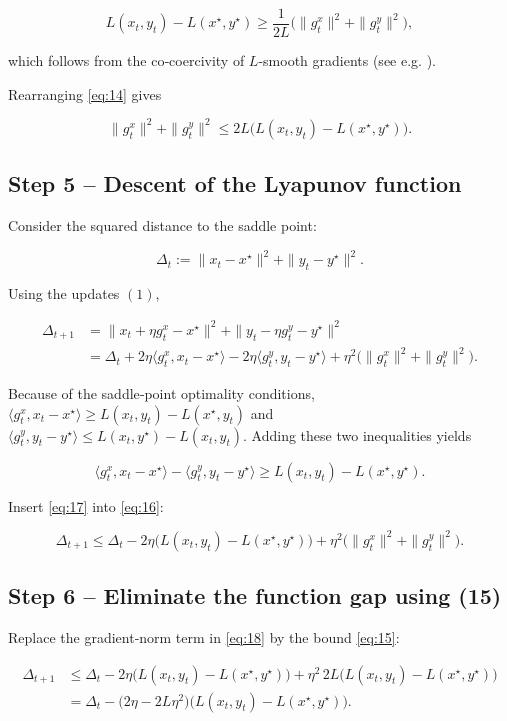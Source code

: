 \documentclass{article}
\begin{document}
\[
L(x_t,y_t)-L(x^{\star},y^{\star})
\ge \frac{1}{2L}\big(\|g_t^{x}\|^{2}+\|g_t^{y}\|^{2}\big),
\tag{14}
\]

which follows from the co‑coercivity of \(L\)-smooth gradients (see e.g. \cite{nesterov2004introductory}).  

Rearranging \eqref{eq:14} gives  

\[
\|g_t^{x}\|^{2}+\|g_t^{y}\|^{2}
\le 2L\big(L(x_t,y_t)-L(x^{\star},y^{\star})\big).
\tag{15}
\]

\subsection*{Step 5 – Descent of the Lyapunov function}
Consider the squared distance to the saddle point:

\[
\Delta_{t}:=\|x_t-x^{\star}\|^{2}+\|y_t-y^{\star}\|^{2}.
\]

Using the updates \((1)\),

\[
\begin{aligned}
\Delta_{t+1}
&= \|x_t+\eta g_t^{x}-x^{\star}\|^{2}
   +\|y_t-\eta g_t^{y}-y^{\star}\|^{2}\\[1mm]
&= \Delta_{t}
   +2\eta\langle g_t^{x},x_t-x^{\star}\rangle
   -2\eta\langle g_t^{y},y_t-y^{\star}\rangle
   +\eta^{2}\big(\|g_t^{x}\|^{2}+\|g_t^{y}\|^{2}\big).
\end{aligned}
\tag{16}
\]

Because of the saddle‑point optimality conditions,
\(\langle g_t^{x},x_t-x^{\star}\rangle\ge L(x_t,y_t)-L(x^{\star},y_t)\) and
\(\langle g_t^{y},y_t-y^{\star}\rangle\le L(x_t,y^{\star})-L(x_t,y_t)\). Adding these two inequalities yields  

\[
\langle g_t^{x},x_t-x^{\star}\rangle
-\langle g_t^{y},y_t-y^{\star}\rangle
\ge L(x_t,y_t)-L(x^{\star},y^{\star}).
\tag{17}
\]

Insert \eqref{eq:17} into \eqref{eq:16}:

\[
\Delta_{t+1}
\le \Delta_{t}
-2\eta\big(L(x_t,y_t)-L(x^{\star},y^{\star})\big)
+\eta^{2}\big(\|g_t^{x}\|^{2}+\|g_t^{y}\|^{2}\big).
\tag{18}
\]

\subsection*{Step 6 – Eliminate the function gap using (15)}
Replace the gradient‑norm term in \eqref{eq:18} by the bound \eqref{eq:15}:

\[
\begin{aligned}
\Delta_{t+1}
&\le \Delta_{t}
-2\eta\big(L(x_t,y_t)-L(x^{\star},y^{\star})\big)
+\eta^{2}\,2L\big(L(x_t,y_t)-L(x^{\star},y^{\star})\big)\\[1mm]
&= \Delta_{t}
-\big(2\eta-2L\eta^{2}\big)\big(L(x_t,y_t)-L(x^{\star},y^{\star})\big).
\end{aligned}
\tag{19}
\]
\end{document}
